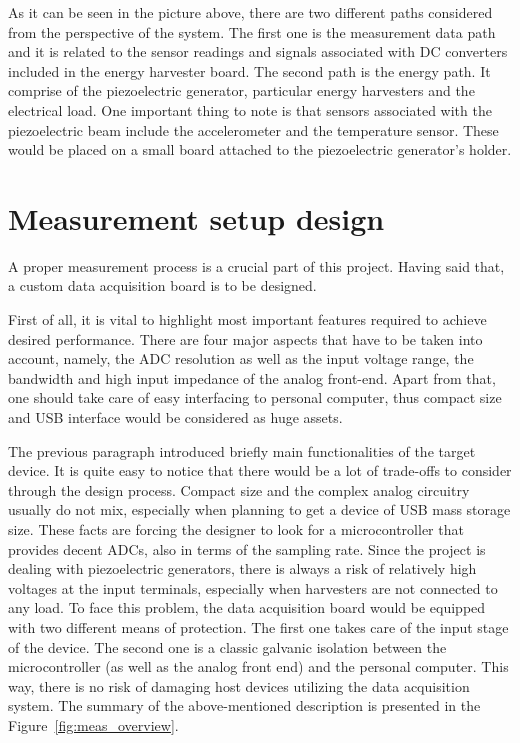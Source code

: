 \documentclass[12pt,a4paper]{article}
\begin{document}
As it can be seen in the picture above, there are two different paths considered from the perspective of the system. The first one is the measurement data path and it is related to the sensor readings and signals associated with DC converters included in the energy harvester board. The second path is the energy path. It comprise of the piezoelectric generator, particular energy harvesters and the electrical load. One important thing to note is that sensors associated with the piezoelectric beam include the accelerometer and the temperature sensor. These would be placed on a small board attached to the piezoelectric generator's holder.


\FloatBarrier

\section{Measurement setup design}


A proper measurement process is a crucial part of this project. Having said that, a custom data acquisition board is to be designed. 
\par

First of all, it is vital to highlight most important features required to achieve desired performance. There are four major aspects that have to be taken into account, namely, the ADC resolution as well as the input voltage range, the bandwidth and high input impedance of the analog front-end. Apart from that, one should take care of easy interfacing to personal computer, thus compact size and USB interface would be considered as huge assets.
\par
The previous paragraph introduced briefly main functionalities of the target device. It is quite easy to notice that there would be a lot of trade-offs to consider through the design process. Compact size and the complex analog circuitry usually do not mix, especially when planning to get a device of USB mass storage size. These facts are forcing the designer to look for a microcontroller that provides decent ADCs, also in terms of the sampling rate. Since the project is dealing with piezoelectric generators, there is always a risk of relatively high voltages at the input terminals, especially when harvesters are not connected to any load. To face this problem, the data acquisition board would be equipped with two different means of protection. The first one takes care of the input stage of the device. The second one is a classic galvanic isolation between the microcontroller (as well as the analog front end) and the personal computer. This way, there is no risk of damaging host devices utilizing the data acquisition system. The summary of the above-mentioned description is presented in the Figure~\ref{fig:meas_overview}.\par
\end{document}

